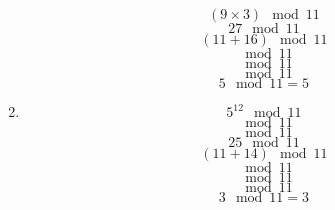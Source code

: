 \documentclass[10pt,a4paper,oneside]{article}
\begin{document}
\begin{enumerate}
\begin{equation}
(9 \times 3) \mod 11
\end{equation}
\begin{equation}
27 \mod 11
\end{equation}
\begin{equation}
(11+16) \mod 11
\end{equation}
\begin{equation}
[ (11 \mod 11)  + (16 \mod 11) ] \mod 11
\end{equation}
\begin{equation}
[ (11 + 5) \mod 11) ] \mod 11
\end{equation}
\begin{equation}
[ (11 \mod 11) + (5 \mod 11) ] \mod 11
\end{equation}
\begin{equation}
5 \mod 11 = 5
\end{equation}
\item
\begin{equation}
5^{12} \mod 11
\end{equation}
\begin{equation}
[ 5^{11} \times 5 ] \mod 11
\end{equation}
\begin{equation}
[ (5 \mod 11) \times 5 ] \mod 11
\end{equation}
\begin{equation}
25 \mod 11
\end{equation}
\begin{equation}
(11 + 14) \mod 11
\end{equation}
\begin{equation}
[ (11 \mod 11) + (14 \mod 11) ] \mod 11
\end{equation}
\begin{equation}
[ (11+3) \mod 11) ] \mod 11
\end{equation}
\begin{equation}
[( (11 \mod 11)  + (3 \mod 11) ) \mod 11 ] \mod 11
\end{equation}
\begin{equation}
3 \mod 11 = 3
\end{equation}
\end{enumerate}
\end{document}
